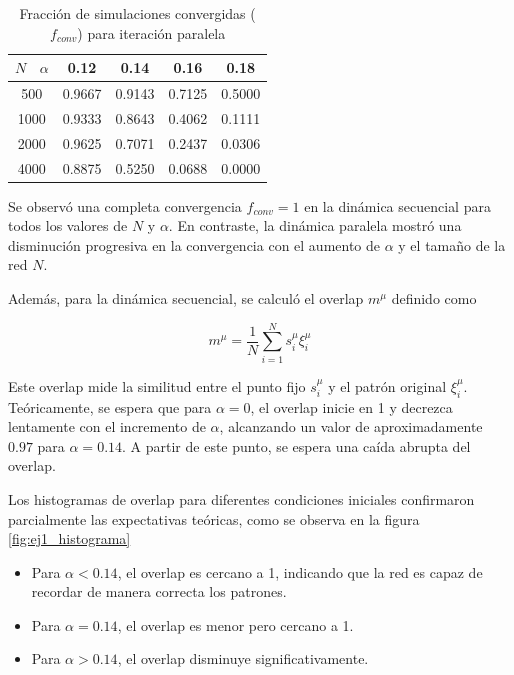 \documentclass[aps,prb,twocolumn,superscriptaddress,floatfix,longbibliography]{revtex4-2}
\newcounter{para}
\begin{document}
\begin{table}[h]
  \centering
  \caption{Fracción de simulaciones convergidas (\( f_{conv} \)) para iteración paralela}
  \label{tab:ej1_f_conv_paralela}
  \begin{tabular}{|c|c|c|c|c|}
  \hline
  \( N \) \ \( \alpha \) & 0.12   & 0.14   & 0.16   & 0.18   \\ \hline
  500            & 0.9667 & 0.9143 & 0.7125 & 0.5000 \\ \hline
  1000           & 0.9333 & 0.8643 & 0.4062 & 0.1111 \\ \hline
  2000           & 0.9625 & 0.7071 & 0.2437 & 0.0306 \\ \hline
  4000           & 0.8875 & 0.5250 & 0.0688 & 0.0000 \\ \hline
  \end{tabular}
\end{table}
  

Se observó una completa convergencia $f_{conv} = 1$ en la dinámica secuencial para todos los valores de \( N \) y \( \alpha \). En contraste, la dinámica paralela mostró una disminución progresiva en la convergencia con el aumento de \( \alpha \) y el tamaño de la red \( N \).

Además, para la dinámica secuencial, se calculó el overlap \( m^{\mu} \) definido como

\[ m^{\mu} = \frac{1}{N} \sum_{i=1}^{N} s_i^{\mu} \xi_i^{\mu} \]

Este overlap mide la similitud entre el punto fijo \( s_i^{\mu} \) y el patrón original \( \xi_i^{\mu} \). Teóricamente, se espera que para \( \alpha = 0 \), el overlap inicie en 1 y decrezca lentamente con el incremento de \( \alpha \), alcanzando un valor de aproximadamente $0.97$ para \( \alpha = 0.14 \). A partir de este punto, se espera una caída abrupta del overlap.

Los histogramas de overlap para diferentes condiciones iniciales confirmaron parcialmente las expectativas teóricas, como se observa en la figura \ref{fig:ej1_histograma}
\begin{itemize}
  \item Para \( \alpha < 0.14 \), el overlap es cercano a 1, indicando que la red es capaz de recordar de manera correcta los patrones.
  \item Para \( \alpha = 0.14 \), el overlap es menor pero cercano a 1.
  \item Para \( \alpha > 0.14 \), el overlap disminuye significativamente.
\end{itemize}
\end{document}
